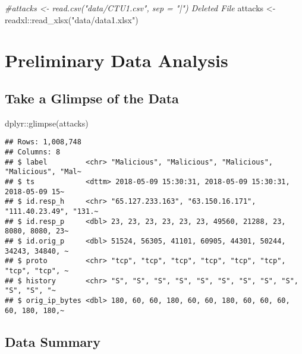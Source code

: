 \documentclass[
]{article}
\newenvironment{Shaded}{\begin{snugshade}}{\end{snugshade}}
\newcommand{\CommentTok}[1]{\textcolor[rgb]{0.56,0.35,0.01}{\textit{#1}}}
\newcommand{\FunctionTok}[1]{\textcolor[rgb]{0.00,0.00,0.00}{#1}}
\newcommand{\NormalTok}[1]{#1}
\newcommand{\OtherTok}[1]{\textcolor[rgb]{0.56,0.35,0.01}{#1}}
\newcommand{\SpecialCharTok}[1]{\textcolor[rgb]{0.00,0.00,0.00}{#1}}
\newcommand{\StringTok}[1]{\textcolor[rgb]{0.31,0.60,0.02}{#1}}
\begin{document}
\begin{Shaded}
\begin{Highlighting}[]
\CommentTok{\#attacks \textless{}{-} read.csv("data/CTU1.csv", sep = "|") Deleted File}
\NormalTok{attacks }\OtherTok{\textless{}{-}}\NormalTok{ readxl}\SpecialCharTok{::}\FunctionTok{read\_xlsx}\NormalTok{(}\StringTok{"data/data1.xlsx"}\NormalTok{)}
\end{Highlighting}
\end{Shaded}

\hypertarget{preliminary-data-analysis}{%
\section{Preliminary Data Analysis}\label{preliminary-data-analysis}}

\hypertarget{take-a-glimpse-of-the-data}{%
\subsection{Take a Glimpse of the
Data}\label{take-a-glimpse-of-the-data}}

\begin{Shaded}
\begin{Highlighting}[]
\NormalTok{dplyr}\SpecialCharTok{::}\FunctionTok{glimpse}\NormalTok{(attacks)}
\end{Highlighting}
\end{Shaded}

\begin{verbatim}
## Rows: 1,008,748
## Columns: 8
## $ label         <chr> "Malicious", "Malicious", "Malicious", "Malicious", "Mal~
## $ ts            <dttm> 2018-05-09 15:30:31, 2018-05-09 15:30:31, 2018-05-09 15~
## $ id.resp_h     <chr> "65.127.233.163", "63.150.16.171", "111.40.23.49", "131.~
## $ id.resp_p     <dbl> 23, 23, 23, 23, 23, 23, 49560, 21288, 23, 8080, 8080, 23~
## $ id.orig_p     <dbl> 51524, 56305, 41101, 60905, 44301, 50244, 34243, 34840, ~
## $ proto         <chr> "tcp", "tcp", "tcp", "tcp", "tcp", "tcp", "tcp", "tcp", ~
## $ history       <chr> "S", "S", "S", "S", "S", "S", "S", "S", "S", "S", "S", "~
## $ orig_ip_bytes <dbl> 180, 60, 60, 180, 60, 60, 180, 60, 60, 60, 60, 180, 180,~
\end{verbatim}

\hypertarget{data-summary}{%
\subsection{Data Summary}\label{data-summary}}
\end{document}
